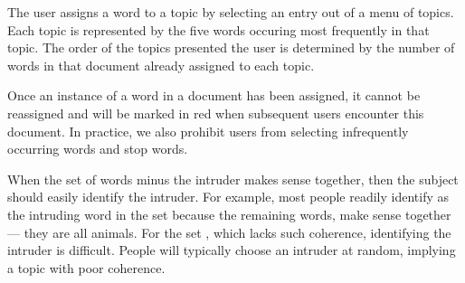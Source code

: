 The user assigns a word to a topic by selecting an entry out of a menu
of topics.  Each topic is represented by the five words occuring most
frequently in that topic.  The order of the topics presented the user
is determined by the number of words in that document already assigned
to each topic.

Once an instance of a word in a document has been assigned, it cannot
be reassigned and will be marked in red when subsequent users
encounter this document.  In practice, we also prohibit users from
selecting infrequently occurring words and stop words.  


When the set of words minus the intruder makes sense together, then
the subject should easily identify the intruder.  For example, most
people readily identify  as the intruding word in the set
 because the remaining
words,  make sense together ---
they are all animals.  For the set , which lacks such coherence, identifying
the intruder is difficult.  People will typically choose an
intruder at random, implying a topic with poor coherence.

